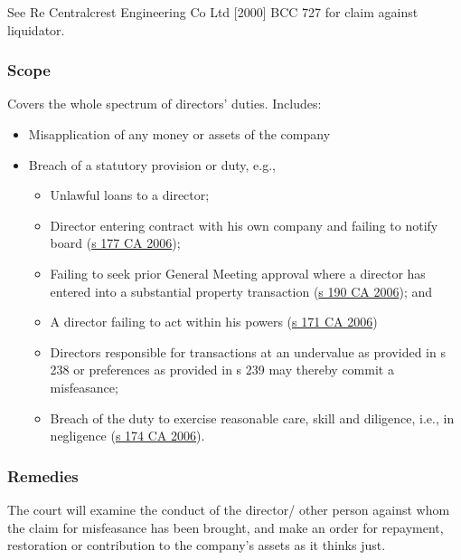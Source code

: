 \documentclass[
]{article}
\providecommand{\tightlist}{%
  \setlength{\itemsep}{0pt}\setlength{\parskip}{0pt}}
\begin{document}
See Re Centralcrest Engineering Co Ltd {[}2000{]} BCC 727 for claim
against liquidator.

\hypertarget{scope}{%
\subsubsection{Scope}\label{scope}}

Covers the whole spectrum of directors' duties. Includes:

\begin{itemize}
\tightlist
\item
  Misapplication of any money or assets of the company
\item
  Breach of a statutory provision or duty, e.g.,

  \begin{itemize}
  \tightlist
  \item
    Unlawful loans to a director;
  \item
    Director entering contract with his own company and failing to
    notify board
    (\href{https://www.legislation.gov.uk/ukpga/2006/46/section/177}{s
    177 CA 2006});
  \item
    Failing to seek prior General Meeting approval where a director has
    entered into a substantial property transaction
    (\href{https://www.legislation.gov.uk/ukpga/2006/46/section/190}{s
    190 CA 2006}); and
  \item
    A director failing to act within his powers
    (\href{https://www.legislation.gov.uk/ukpga/2006/46/section/171}{s
    171 CA 2006})
  \item
    Directors responsible for transactions at an undervalue as provided
    in s 238 or preferences as provided in s 239 may thereby commit a
    misfeasance;
  \item
    Breach of the duty to exercise reasonable care, skill and diligence,
    i.e., in negligence
    (\href{https://www.legislation.gov.uk/ukpga/2006/46/section/174}{s
    174 CA 2006}).
  \end{itemize}
\end{itemize}

\hypertarget{remedies}{%
\subsubsection{Remedies}\label{remedies}}

The court will examine the conduct of the director/ other person against
whom the claim for misfeasance has been brought, and make an order for
repayment, restoration or contribution to the company's assets as it
thinks just.
\end{document}
